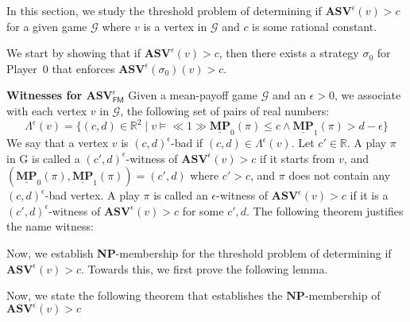 In this section, we study the threshold problem of determining if $\mathbf{ASV}^{\epsilon}(v) > c$  for a given game $\mathcal{G}$ where $v$ is a vertex in $\mathcal{G}$ and $c$ is some rational constant.

We start by showing that if $\mathbf{ASV}^{\epsilon}(v) > c$, then there exists a strategy $\sigma_0$ for Player~0 that enforces $\mathbf{ASV}^{\epsilon}(\sigma_0)(v) > c$.



\noindent\textbf{Witnesses for $\mathbf{ASV}^{\epsilon}_{\mathsf{FM}}$} Given a mean-payoff game $\mathcal{G}$ and an $\epsilon > 0$, we associate with each vertex $v$ in $\mathcal{G}$, the following set of pairs of real numbers:
\begin{equation*}
\Lambda^{\epsilon}(v) = \{(c,d) \in \mathbb{R}^2 \mid v \models \ll 1 \gg \underline{\mathbf{MP}}_0(\pi) \leqslant c \land \underline{\mathbf{MP}}_1(\pi) > d-\epsilon \}
\end{equation*}
We say that a vertex $v$ is $(c,d)^{\epsilon}$-bad if $(c,d) \in \Lambda^{\epsilon}(v)$. Let $c' \in \mathbb{R}$. A play $\pi$ in G is called a $(c',d)^{\epsilon}$-witness of $\mathbf{ASV}^{\epsilon}(v) > c$ if it starts from $v$, and $(\underline{\mathbf{MP}}_0(\pi), \underline{\mathbf{MP}}_1(\pi)) = (c', d)$ where $c' > c$, and $\pi$ does not contain any $(c,d)^{\epsilon}$-bad vertex. A play $\pi$ is called an $\epsilon$-witness of $\mathbf{ASV}^{\epsilon}(v) > c$ if it is a $(c',d)^{\epsilon}$-witness of $\mathbf{ASV}^{\epsilon}(v) > c$ for some $c',d$. The following theorem justifies the name witness:



Now, we establish \textbf{NP}-membership for the threshold problem of determining if $\mathbf{ASV}^{\epsilon}(v) > c$. Towards this, we first prove the following lemma.



Now, we state the following theorem that establishes the $\mathbf{NP}$-membership of $\mathbf{ASV}^{\epsilon}(v) > c$
